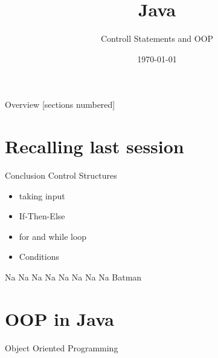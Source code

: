 


\title{Java}
\subtitle{Controll Statements and OOP}
\date{\today}


	
	\begin{frame}
		\titlepage
	\end{frame}
	\begin{frame}{Overview}
		[sections numbered]
		\tableofcontents
	\end{frame}
	
	\section{Recalling last session}
	\begin{frame}{Conclusion}
		Control Structures
		\begin{itemize}
			\item taking input
			\item If-Then-Else
			\item for and while loop
			\item Conditions
		\end{itemize}
		Na Na Na Na Na Na Na Na Batman
	\end{frame}	
	
	\section{OOP in Java}
	
	\begin{frame}{}
		\begin{center}
			{\huge Object Oriented Programming}
		\end{center}
	\end{frame}

